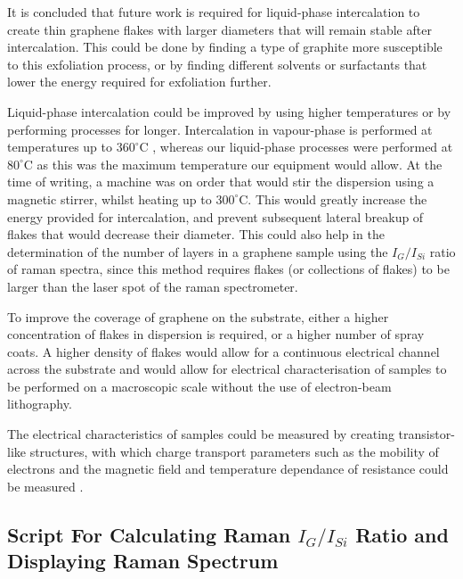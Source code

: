 \documentclass[12pt,titlepage]{article}
\begin{document}
	It is concluded that future work is required for liquid-phase intercalation to create thin graphene flakes with larger diameters that will remain stable after intercalation. This could be done by finding a type of graphite more susceptible to this exfoliation process, or by finding different solvents or surfactants that lower the energy required for exfoliation further.
	
	Liquid-phase intercalation could be improved by using higher temperatures or by performing processes for longer. Intercalation in vapour-phase is performed at temperatures up to $360^{\circ}$C \cite{Khrapach2012a}, whereas our liquid-phase processes were performed at $80^{\circ}$C as this was the maximum temperature our equipment would allow. At the time of writing, a machine was on order that would stir the dispersion using a magnetic stirrer, whilst heating up to $300^{\circ}$C. This would greatly increase the energy provided for intercalation, and prevent subsequent lateral breakup of flakes that would decrease their diameter. This could also help in the determination of the number of layers in a graphene sample using the $I_G/I_{Si}$ ratio of raman spectra, since this method requires flakes (or collections of flakes) to be larger than the laser spot of the raman spectrometer.
	
	To improve the coverage of graphene on the substrate, either a higher concentration of flakes in dispersion is required, or a higher number of spray coats. A higher density of flakes would allow for a continuous electrical channel across the substrate and would allow for electrical characterisation of samples to be performed on a macroscopic scale without the use of electron-beam lithography.
	
	The electrical characteristics of samples could be measured by creating transistor-like structures, with which charge transport parameters such as the mobility of electrons and the magnetic field and temperature dependance of resistance could be measured \cite{Kim2011,Ye2011}.
	
	\newpage
	\begin{appendices}
		\section{Script For Calculating Raman $I_G/I_{Si}$ Ratio and Displaying Raman Spectrum}
		\label{app:ramanratio}
		
						
		\newpage
	\end{appendices}
	
	\newpage
	
	{}
	
\end{document}
